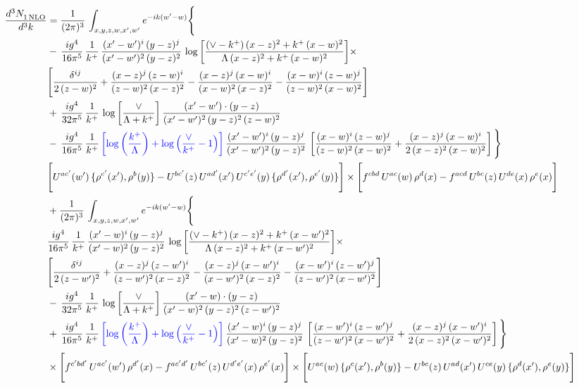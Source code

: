 \documentclass[9pt]{article}
\numberwithin{equation}{section}
\begin{document}
\begin{align}
 \frac{d^{3}N_{1\,\rm NLO}^{\rm}}{d^{3}k}  & =    \frac{1}{(2\pi)^{3}}\,\int_{x,y,z,w,x',w^{\prime}} e^{-ik(w^{\prime}-w)}\Bigg\{ \notag \\ & -\, \frac{ig^{4}}{16\pi^{5}}\,\frac{1}{k^{+}}\, \frac{(x'-w')^{i}\,(y-z)^{j}}{(x'-w')^{2}\,(y-z)^{2}}\,\log{\left[\frac{(\vee-k^{+})\,(x-z)^{2}+k^{+}\,(x-w)^{2}}{\Lambda\, (x-z)^{2}+k^{+}\,(x-w)^{2}}\right]}\times\notag \\ &  \Bigg[\frac{\delta^{ij}}{2\,(z-w)^{2}}+\frac{(x-z)^{j}\,(z-w)^{i}}{(z-w)^{2}\,(x-z)^{2}}-\frac{(x-z)^{j}\,(x-w)^{i}}{(x-w)^{2}\,(x-z)^{2}}-\frac{(x-w)^{i}\,(z-w)^{j}}{(z-w)^{2}\,(x-w)^{2}}\Bigg]\notag \\ & +\,\frac{ig^{4}}{32\pi^{5}}\,\frac{1}{k^{+}}\,\log{\left[\frac{\vee}{\Lambda + k^{+}}\right]}\, \frac{(x'-w')\cdot (y-z)}{(x'-w')^{2}\,(y-z)^{2}\,(z-w)^{2}}\notag \\ & -\, \frac{ig^{4}}{16\pi^{5}}\,\frac{1}{k^{+}}\,{\color{blue}\left[\log{\left(\frac{k^{+}}{\Lambda}\right)}+\log{\left(\frac{\vee}{k^{+}}-1\right)}\right]}\,\frac{(x'-w')^{i}\,(y-z)^{j}}{(x'-w')^{2}\,(y-z)^{2}}\,\left[\frac{(x-w)^{i}\,(z-w)^{j}}{(z-w)^{2}\,(x-w)^{2}}+\frac{(x-z)^{j}\,(x-w)^{i}}{2\,(x-z)^{2}\, (x-w)^{2}}\right]\Bigg\} \notag \\ & \Bigg[U^{ac'}(w')\,\{\rho^{c'}(x'),\rho^{b}(y)\}-U^{bc'}(z)\,U^{ad'}(x')\,U^{c'e'}(y)\, \{\rho^{d'}(x'),\rho^{e'}(y)\}\Bigg]\times \Bigg[f^{cbd}\,U^{ac}(w)\,\rho^{d}(x)-f^{acd}\, U^{bc}(z)\,U^{de}(x)\,\rho^{e}(x)\Bigg]\notag \\ & + \frac{1}{(2\pi)^{3}}\,\int_{x,y,z,w,x',w^{\prime}} e^{-ik(w^{\prime}-w)}\Bigg\{ \notag \\ &  \frac{ig^{4}}{16\pi^{5}}\,\frac{1}{k^{+}}\, \frac{(x'-w)^{i}\,(y-z)^{j}}{(x'-w)^{2}\,(y-z)^{2}}\,\log{\left[\frac{(\vee-k^{+})\,(x-z)^{2}+k^{+}\,(x-w')^{2}}{\Lambda\, (x-z)^{2} + k^{+}\,(x-w')^{2}}\right]}\times\notag \\ &  \Bigg[\frac{\delta^{ij}}{2\,(z-w')^{2}}+\frac{(x-z)^{j}\,(z-w')^{i}}{(z-w')^{2}\,(x-z)^{2}}-\frac{(x-z)^{j}\,(x-w')^{i}}{(x-w')^{2}\,(x-z)^{2}}-\frac{(x-w')^{i}\,(z-w')^{j}}{(z-w')^{2}\,(x-w')^{2}}\Bigg]\notag \\ & -\,\frac{ig^{4}}{32\pi^{5}}\,\frac{1}{k^{+}}\,\log{\left[\frac{\vee}{\Lambda + k^{+}}\right]}\, \frac{(x'-w)\cdot (y-z)}{(x'-w)^{2}\,(y-z)^{2}\,(z-w')^{2}}\notag \\ & +\,\frac{ig^{4}}{16\pi^{5}}\,\frac{1}{k^{+}}\,{\color{blue}\left[\log{\left(\frac{k^{+}}{\Lambda}\right)}+\log{\left(\frac{\vee}{k^{+}}-1\right)}\right]}\,\frac{(x'-w)^{i}\,(y-z)^{j}}{(x'-w)^{2}\,(y-z)^{2}}\,\left[\frac{(x-w')^{i}\,(z-w')^{j}}{(z-w')^{2}\,(x-w')^{2}}+\frac{(x-z)^{j}\,(x-w')^{i}}{2\,(x-z)^{2}\, (x-w')^{2}}\right] \Bigg\} \notag \\ & \times\Bigg[f^{c'bd'}\,U^{ac'}(w')\,\rho^{d'}(x)-f^{ac'd'}\, U^{bc'}(z)\,U^{d'e'}(x)\,\rho^{e'}(x)\Bigg] \times \Bigg[U^{ac}(w)\,\{\rho^{c}(x'),\rho^{b}(y)\}-U^{bc}(z)\,U^{ad}(x')\,U^{ce}(y)\, \{\rho^{d}(x'),\rho^{e}(y)\}\Bigg]
\end{align}
\end{document}

